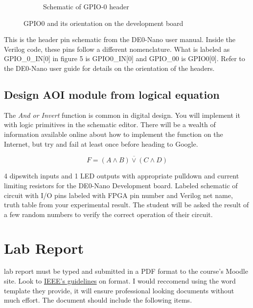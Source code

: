 \begin{figure}
\begin{subfigure}[b]{.45\textwidth}
            \caption{Schematic of GPIO-0 header\cite{DE0Manual}}
          \end{subfigure}
          \caption{GPIO0 and its orientation on the development board}
          \label{pinmap}
        \end{figure}
        This is the header pin schematic from the DE0-Nano user manual. Inside the Verilog code, these pins follow a different nomenclature. What is labeled as GPIO\_0\_IN[0] in figure 5 is GPIO0\_IN[0] and GPIO\_00 is GPIO0[0]. Refer to the DE0-Nano user guide for details on the orientation of the headers.        

      \subsection{Design AOI module from logical equation} 
        The {\it And or Invert} function is common in digital design. You will implement it with logic primitives in the schematic editor. There will be a wealth of information available online about how to implement the function on the Internet, but try and fail at least once before heading to Google.

      \begin{displaymath}
        F = \overline{(A \wedge B) \vee (C \wedge D)}
      \end{displaymath}

    {4 dipswitch inputs and 1 LED outputs with appropriate pulldown and current limiting resistors for the DE0-Nano Development board. }
    {Labeled schematic of circuit with I/O pins labeled with FPGA pin number and Verilog net name,  truth table from your  experimental result.}
    {The student will be asked the result of a few random numbers to verify the correct operation of their circuit.}

  \section{Lab Report}
     lab report must be typed and submitted in a PDF format to the course's Moodle site. Look to \href{http://www.ieee.org/conferences_events/conferences/publishing/templates.html}{IEEE's guidelines} on format. I would reccomend  using the word template they provide, it will ensure professional looking documents without much effort. The document should include the following items.
    
